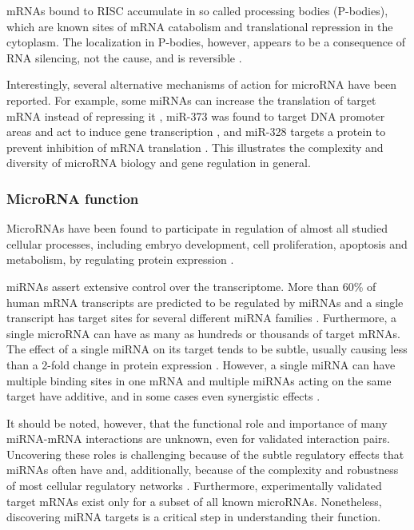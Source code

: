 mRNAs bound to RISC accumulate in so called processing bodies (P-bodies),
which are known sites of mRNA catabolism and translational repression in the
cytoplasm. The localization in P-bodies, however, appears to be a consequence
of RNA silencing, not the cause, and is reversible  \citep{Eulalio2007}.

Interestingly, several alternative mechanisms of action for microRNA have been
reported. For example, some miRNAs can increase the translation of target mRNA instead of
repressing it \citep{Vasudevan2007}, miR-373
was found to target DNA promoter areas and act to induce gene transcription
\citep{Place2008}, and miR-328 targets a protein to prevent inhibition of mRNA
translation \citep{Eiring2010}. This illustrates the complexity and diversity of
microRNA biology and gene regulation in general.






\subsubsection{MicroRNA function}\label{microrna-function}

MicroRNAs have been found to participate in regulation of almost all studied
cellular processes, including embryo development, cell proliferation,
apoptosis and metabolism, by regulating protein expression \cite{}.

miRNAs assert extensive control over the transcriptome. More than 60\% of
human mRNA transcripts are predicted to be regulated by miRNAs and a single
transcript has target sites for several different miRNA families
\citep{Friedman2009}. Furthermore, a single microRNA can have as many as hundreds or
thousands of target mRNAs. The effect of a
single miRNA on its target tends to be subtle, usually causing less than a
2-fold change in protein expression \citep{Baek2008}. However, a single
miRNA can have multiple binding sites in one mRNA and multiple miRNAs
acting on the same target have additive, and in some cases even synergistic
effects \citep{Bartel2009}.



It should be noted, however, that the functional role and importance of many
miRNA-mRNA interactions are unknown, even for validated interaction pairs.
Uncovering these roles is challenging because of the subtle regulatory effects
that miRNAs often have and, additionally, because of the complexity and
robustness of most cellular regulatory networks \citep{Bartel2009}.
Furthermore, experimentally validated target mRNAs exist only for a subset of
all known microRNAs. Nonetheless, discovering miRNA targets is a critical
step in understanding their function.

